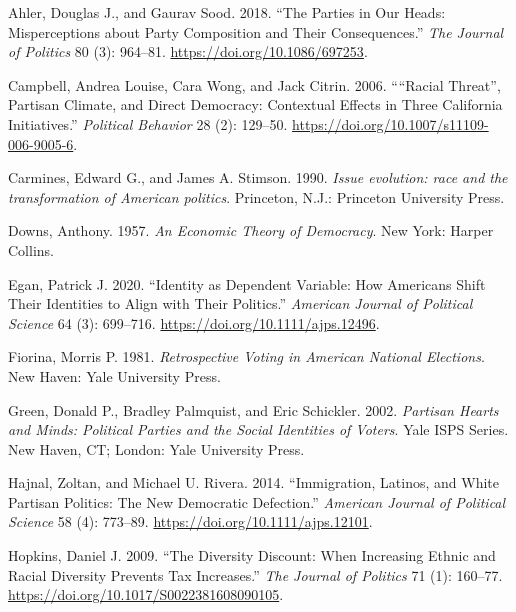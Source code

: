 \documentclass[
  12pt,
]{article}
\newlength{\cslhangindent}
\newlength{\cslentryspacingunit} %
\newenvironment{CSLReferences}[2] %
 {%
  \setlength{\parindent}{0pt}
  \ifodd #1
  \let\oldpar\par
  \def\par{\hangindent=\cslhangindent\oldpar}
  \fi
  \setlength{\parskip}{#2\cslentryspacingunit}
 }%
 {}
\begin{document}
\hypertarget{refs}{}
\begin{CSLReferences}{1}{0}
\leavevmode{}%
Ahler, Douglas J., and Gaurav Sood. 2018. {``The Parties in Our Heads:
Misperceptions about Party Composition and Their Consequences.''}
\emph{The Journal of Politics} 80 (3): 964--81.
\url{https://doi.org/10.1086/697253}.

\leavevmode{}%
Campbell, Andrea Louise, Cara Wong, and Jack Citrin. 2006. {``{``}Racial
Threat{''}, Partisan Climate, and Direct Democracy: Contextual Effects
in Three California Initiatives.''} \emph{Political Behavior} 28 (2):
129--50. \url{https://doi.org/10.1007/s11109-006-9005-6}.

\leavevmode{}%
Carmines, Edward G., and James A. Stimson. 1990. \emph{Issue evolution:
race and the transformation of American politics}. Princeton, N.J.:
Princeton University Press.

\leavevmode{}%
Downs, Anthony. 1957. \emph{An Economic Theory of Democracy}. New York:
Harper Collins.

\leavevmode{}%
Egan, Patrick J. 2020. {``Identity as Dependent Variable: How Americans
Shift Their Identities to Align with Their Politics.''} \emph{American
Journal of Political Science} 64 (3): 699--716.
\url{https://doi.org/10.1111/ajps.12496}.

\leavevmode{}%
Fiorina, Morris P. 1981. \emph{Retrospective Voting in American National
Elections}. New Haven: Yale University Press.

\leavevmode{}%
Green, Donald P., Bradley Palmquist, and Eric Schickler. 2002.
\emph{Partisan Hearts and Minds: Political Parties and the Social
Identities of Voters}. Yale ISPS Series. New Haven, CT; London: Yale
University Press.

\leavevmode{}%
Hajnal, Zoltan, and Michael U. Rivera. 2014. {``Immigration, Latinos,
and White Partisan Politics: The New Democratic Defection.''}
\emph{American Journal of Political Science} 58 (4): 773--89.
\url{https://doi.org/10.1111/ajps.12101}.

\leavevmode{}%
Hopkins, Daniel J. 2009. {``The Diversity Discount: When Increasing
Ethnic and Racial Diversity Prevents Tax Increases.''} \emph{The Journal
of Politics} 71 (1): 160--77.
\url{https://doi.org/10.1017/S0022381608090105}.


\end{CSLReferences}
\end{document}
